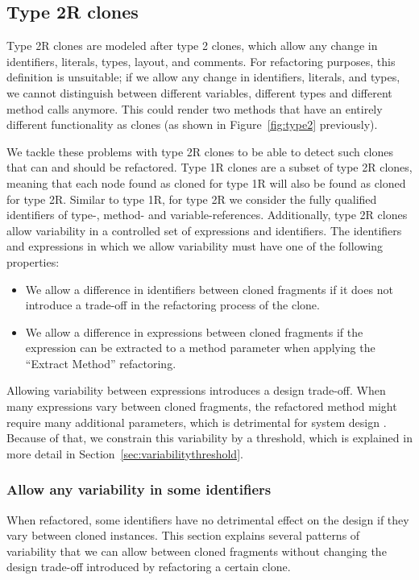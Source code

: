\subsection{Type 2R clones} \label{sec:type2r}
Type 2R clones are modeled after type 2 clones, which allow any change in identifiers, literals, types, layout, and comments. For refactoring purposes, this definition is unsuitable; if we allow any change in identifiers, literals, and types, we cannot distinguish between different variables, different types and different method calls anymore. This could render two methods that have an entirely different functionality as clones (as shown in Figure~\ref{fig:type2} previously).

We tackle these problems with type 2R clones to be able to detect such clones that can and should be refactored. Type 1R clones are a subset of type 2R clones, meaning that each node found as cloned for type 1R will also be found as cloned for type 2R. Similar to type 1R, for type 2R we consider the fully qualified identifiers of type-, method- and variable-references. Additionally, type 2R clones allow variability in a controlled set of expressions and identifiers. The identifiers and expressions in which we allow variability must have one of the following properties:
\begin{itemize}
  \item We allow a difference in identifiers between cloned fragments if it does not introduce a trade-off in the refactoring process of the clone.
  \item We allow a difference in expressions between cloned fragments if the expression can be extracted to a method parameter when applying the ``Extract Method'' refactoring.
\end{itemize}

Allowing variability between expressions introduces a design trade-off. When many expressions vary between cloned fragments, the refactored method might require many additional parameters, which is detrimental for system design \cite{heitlager2007practical}. Because of that, we constrain this variability by a threshold, which is explained in more detail in Section~\ref{sec:variabilitythreshold}.%

\subsubsection{Allow any variability in some identifiers}
When refactored, some identifiers have no detrimental effect on the design if they vary between cloned instances. This section explains several patterns of variability that we can allow between cloned fragments without changing the design trade-off introduced by refactoring a certain clone.

